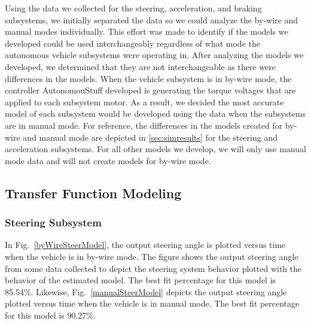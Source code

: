 \documentclass[journal,twoside,web]{ieeecolor}
\begin{document}
Using the data we collected for the steering, acceleration, and braking subsystems, we initially separated the data so we could analyze the by-wire and manual modes individually. This effort was made to identify if the models we developed could be used interchangeably regardless of what mode the autonomous vehicle subsystems were operating in. After analyzing the models we developed, we determined that they are not interchangeable as there were differences in the models. When the vehicle subsystem is in by-wire mode, the controller AutonomouStuff developed is generating the torque voltages that are applied to each subsystem motor. As a result, we decided the most accurate model of each subsystem would be developed using the data when the subsystems are in manual mode. For reference, the differences in the models created for by-wire and manual mode are depicted in \ref{sec:simresults} for the steering and acceleration subsystems. For all other models we develop, we will only use manual mode data and will not create models for by-wire mode.


\subsection{Transfer Function Modeling}
\label{sec:TransferFunctionModeling}

\subsubsection{Steering Subsystem}
In Fig.~\ref{byWireSteerModel}, the output steering angle is plotted versus time
when the vehicle is in by-wire mode. The figure shows the output steering angle
from some data collected to depict the steering system behavior plotted with the
behavior of the estimated model. The best fit percentage for this model is
85.54\%. Likewise, Fig.~\ref{manualSteerModel} depicts the output steering angle
plotted versus time when the vehicle is in manual mode. The best fit percentage
for this model is 90.27\%.
\end{document}
